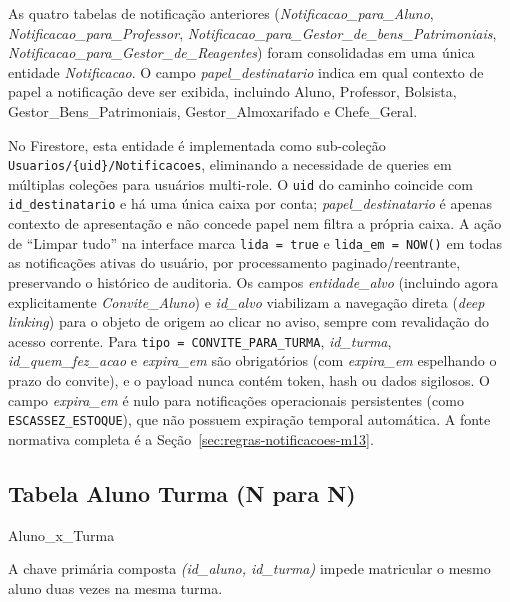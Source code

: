 \begin{explicacao}
As quatro tabelas de notificação anteriores (\textit{Notificacao\_para\_Aluno}, \textit{Notificacao\_para\_Professor}, \textit{Notificacao\_para\_Gestor\_de\_bens\_Patrimoniais}, \textit{Notificacao\_para\_Gestor\_de\_Reagentes}) foram consolidadas em uma única entidade \textit{Notificacao}. O campo \textit{papel\_destinatario} indica em qual contexto de papel a notificação deve ser exibida, incluindo Aluno, Professor, Bolsista, Gestor\_Bens\_Patrimoniais, Gestor\_Almoxarifado e Chefe\_Geral.

No Firestore, esta entidade é implementada como sub-coleção \texttt{Usuarios/\{uid\}/Notificacoes}, eliminando a necessidade de queries em múltiplas coleções para usuários multi-role. O \texttt{uid} do caminho coincide com \texttt{id\_destinatario} e há uma única caixa por conta; \textit{papel\_destinatario} é apenas contexto de apresentação e não concede papel nem filtra a própria caixa. A ação de ``Limpar tudo'' na interface marca \texttt{lida = true} e \texttt{lida\_em = NOW()} em todas as notificações ativas do usuário, por processamento paginado/reentrante, preservando o histórico de auditoria. Os campos \textit{entidade\_alvo} (incluindo agora explicitamente \textit{Convite\_Aluno}) e \textit{id\_alvo} viabilizam a navegação direta (\textit{deep linking}) para o objeto de origem ao clicar no aviso, sempre com revalidação do acesso corrente. Para \texttt{tipo = CONVITE\_PARA\_TURMA}, \textit{id\_turma}, \textit{id\_quem\_fez\_acao} e \textit{expira\_em} são obrigatórios (com \textit{expira\_em} espelhando o prazo do convite), e o payload nunca contém token, hash ou dados sigilosos. O campo \textit{expira\_em} é nulo para notificações operacionais persistentes (como \texttt{ESCASSEZ\_ESTOQUE}), que não possuem expiração temporal automática. A fonte normativa completa é a Seção~\ref{sec:regras-notificacoes-m13}.
\end{explicacao}

\subsection{Tabela Aluno Turma (N para N)}
\begin{entidade}{Aluno\_x\_Turma}
\end{entidade}
\begin{regra}
A chave primária composta \textit{(id\_aluno, id\_turma)} impede matricular o mesmo aluno duas vezes na mesma turma.
\end{regra}

